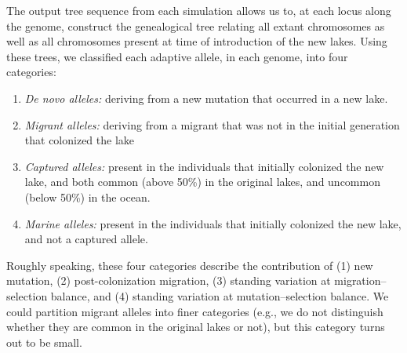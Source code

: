 \documentclass{article}
\begin{document}
The output tree sequence from each simulation allows us to,
at each locus along the genome,
construct the genealogical tree relating all extant chromosomes
as well as all chromosomes present at time of introduction of the new lakes.
Using these trees,
we classified each adaptive allele, in each genome,
into four categories:
\begin{enumerate}
    \item \emph{De novo alleles:}
        deriving from a new mutation that occurred in a new lake.
    \item \emph{Migrant alleles:} 
        deriving from a migrant that was not in the initial generation that colonized the lake
    \item \emph{Captured alleles:}
        present in the individuals that initially colonized the new lake, 
        and both common (above 50\%) in the original lakes,
        and uncommon (below 50\%) in the ocean.
    \item \emph{Marine alleles:} 
        present in the individuals that initially colonized the new lake, 
        and not a captured allele.
\end{enumerate}

Roughly speaking, these four categories describe the contribution of
(1) new mutation, 
(2) post-colonization migration, 
(3) standing variation at migration--selection balance, and
(4) standing variation at mutation--selection balance.
We could partition migrant alleles into finer categories
(e.g., we do not distinguish whether they are common in the original lakes or not),
but this category turns out to be small.

\end{document}
